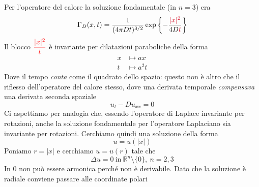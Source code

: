 \documentclass[10pt,a4paper,twoside,openright]{book}
\begin{document}
Per l'operatore del calore la soluzione fondamentale (in $\displaystyle n=3$) era
\begin{equation*}
	\Gamma _{D}(x,t) =\frac{1}{(4\pi Dt)^{3/2}}\exp\left\{-\frac{\textcolor[rgb]{0.82,0.01,0.11}{| }\textcolor[rgb]{0.82,0.01,0.11}{x}\textcolor[rgb]{0.82,0.01,0.11}{| }\textcolor[rgb]{0.82,0.01,0.11}{^{2}}}{4D\textcolor[rgb]{0.82,0.01,0.11}{t}}\right\}
\end{equation*}
Il blocco $\displaystyle \textcolor[rgb]{1,0,0}{\frac{| x| ^{2}}{t}}$ è invariante per dilatazioni paraboliche della forma
\begin{align*}
	x & \longmapsto ax      \\
	t & \longmapsto a^{2} t 
\end{align*}
Dove il tempo \textit{conta} come il quadrato dello spazio: questo non è altro che il riflesso dell'operatore del calore stesso, dove una derivata temporale \textit{compensava} una derivata seconda spaziale	
\begin{equation*}
	u_{t} -Du_{xx} =0
\end{equation*}
Ci aspettiamo per analogia che, essendo l'operatore di Laplace invariante per rotazioni, anche la soluzione fondamentale per l'operatore Laplaciano sia invariante per rotazioni. Cerchiamo quindi una soluzione della forma
\begin{equation*}
	u=u(| x|)
\end{equation*}
Poniamo $\displaystyle r=| x| $ e cerchiamo $\displaystyle u=u(r)$ tale che
\begin{equation*}
	\Delta u=0\ \text{in} \ \mathbb{R}^{n} \setminus \{0\},\ n=2,3
\end{equation*}
In $\displaystyle 0$ non può essere armonica perché non è derivabile. Dato che la soluzione è radiale conviene passare alle coordinate polari
\end{document}
